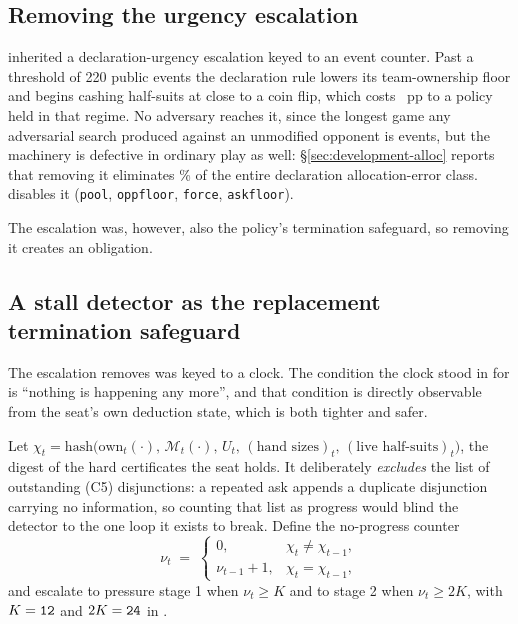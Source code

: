 \subsection{Removing the urgency escalation}
\label{sec:agent-urgency}

\vsix{} inherited a declaration-urgency escalation keyed to an event counter. Past a threshold of 220
public events the declaration rule lowers its team-ownership floor and begins cashing half-suits at
close to a coin flip, which costs \vsevenCliff{}~pp to a policy held in that regime. No adversary
reaches it, since the longest game any adversarial search produced against an unmodified opponent is
\vsevenCliffIncumbentTail{} events, but the machinery is defective in ordinary play as well:
\S\ref{sec:development-alloc} reports that removing it eliminates \vsevenLoneUrgencyShare\% of the
entire declaration allocation-error class. \sestina{} disables it
(\texttt{pool}, \texttt{oppfloor}, \texttt{force}, \texttt{askfloor}).

The escalation was, however, also the policy's termination safeguard, so removing it creates an
obligation.

\subsection{A stall detector as the replacement termination safeguard}
\label{sec:agent-stall}

The escalation \sestina{} removes was keyed to a clock. The condition the clock stood in for is
``nothing is happening any more'', and that condition is directly observable from the seat's own
deduction state, which is both tighter and safer.

Let $\chi_t = \mathrm{hash}\bigl(\mathrm{own}_t(\cdot),\, \mathcal{M}_t(\cdot),\, U_t,\,
(\text{hand sizes})_t,\, (\text{live half-suits})_t\bigr)$, the digest of the hard certificates the
seat holds. It deliberately \emph{excludes} the list of outstanding (C5) disjunctions: a repeated ask
appends a duplicate disjunction carrying no information, so counting that list as progress would
blind the detector to the one loop it exists to break. Define the
no-progress counter
\begin{equation}
  \nu_t \;=\;
  \begin{cases}
    0, & \chi_t \neq \chi_{t-1},\\
    \nu_{t-1} + 1, & \chi_t = \chi_{t-1},
  \end{cases}
  \label{eq:stall}
\end{equation}
and escalate to pressure stage 1 when $\nu_t \ge K$ and to stage 2 when $\nu_t \ge 2K$, with
$K = \texttt{12{}}$ and $2K = \texttt{24{}}$ in \sestina{}.

